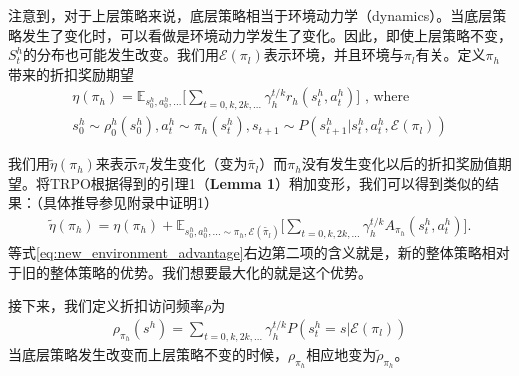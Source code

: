 \documentclass[degree=bachelor, tocarialchapter, pifootnote]{thuthesis}
\begin{document}
注意到，对于上层策略来说，底层策略相当于环境动力学（dynamics）。当底层策略发生了变化时，可以看做是环境动力学发生了变化。因此，即使上层策略不变，$S^h_t$的分布也可能发生改变。我们用$\mathcal{E}(\pi_l)$表示环境，并且环境与$\pi_l$有关。定义$\pi_h$带来的折扣奖励期望
\begin{equation}
\begin{aligned}
  \eta(\pi_h) = \mathbb{E}_{s_0^h, a_0^h, ...}\Bigg[\sum_{t = 0, k, 2k, ...} \gamma_h^{t/k} r_h(s_t^h, a_t^h)\Bigg] \text{ ,  where}   \\
  s_0^h \sim \rho_0^h(s_0^h), a_t^h \sim \pi_h(s_t^h), s_{t+1} \sim P(s_{t+1}^h|s_t^h, a_t^h, \mathcal{E}(\pi_l))
\end{aligned}
\end{equation}

我们用$\tilde{\eta}(\pi_h)$来表示$\pi_l$发生变化（变为$\tilde{\pi_l}$）而$\pi_h$没有发生变化以后的折扣奖励值期望。将TRPO根据\cite{TRPO_pre}得到的引理1（\textbf{Lemma 1}）稍加变形，我们可以得到类似的结果：（具体推导参见附录中证明1）
\begin{align}
  \tilde{\eta}(\pi_h) = \eta(\pi_h) + \mathbb{E}_{s_0^h, a_0^h, ... \sim \pi_h, \mathcal{E}(\tilde{\pi_l})}\Bigg[\sum_{t=0,k,2k,...} \gamma_h^{t/k} A_{\pi_h}(s_t^h, a_t^h)\Bigg].
  \label{eq:new_environment_advantage}
\end{align}
等式\eqref{eq:new_environment_advantage}右边第二项的含义就是，新的整体策略相对于旧的整体策略的优势。我们想要最大化的就是这个优势。

接下来，我们定义折扣访问频率$\rho$为
\begin{align}
  \rho_{\pi_h}(s^h) = \sum_{t = 0, k, 2k, ...}\gamma_h^{t/k}P(s_t^h = s|\mathcal{E}(\pi_l))
\end{align}
当底层策略发生改变而上层策略不变的时候，$\rho_{\pi_h}$相应地变为$\tilde{\rho}_{\pi_h}$。
\end{document}
